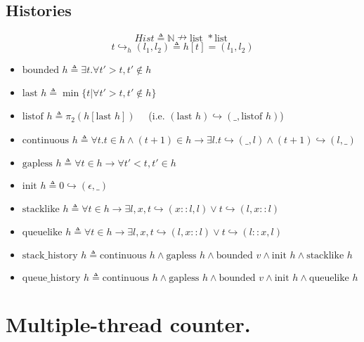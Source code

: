 \documentclass[8pt]{article}
\newcommand{\listpt}{\text{list }}
\begin{document}
\subsection{Histories}
$$Hist \triangleq \mathbb{N} \nrightarrow \listpt * \listpt$$
$$t \hookrightarrow_h (l_1, l_2) \triangleq h[t] = (l_1, l_2)$$
\begin{itemize}
\item $\text{bounded } h  \triangleq \exists t. \forall t' > t, t' \not \in h$
\item $\text{last } h \triangleq \min \{ t | \forall t' > t, t' \not \in h \}$
\item $\text{listof } h \triangleq \pi_2 (h[\text{last } h])$  \ \ (i.e. $(\text{last } h) \hookrightarrow (\_, \text{listof }h )$)
\item $\text{continuous } h  \triangleq \forall t. t\in h \wedge (t+1) \in h \rightarrow \exists l. t \hookrightarrow ( \_ , l) \wedge (t+1) \hookrightarrow (l, \_) $
\item $\text{gapless } h  \triangleq \forall t \in h \rightarrow \forall t' < t, t' \in h $
\item $\text{init } h  \triangleq 0 \hookrightarrow (\epsilon, \_) $
\item $\text{stacklike } h  \triangleq \forall t\in h \rightarrow \exists l, x, t \hookrightarrow ( x::l , l) \vee t \hookrightarrow (l, x::l) $
\item $\text{queuelike } h  \triangleq \forall t\in h \rightarrow \exists l, x, t \hookrightarrow ( l , x::l) \vee t \hookrightarrow (l::x, l) $
\item  $\text{stack\_history } h \triangleq \text{continuous } h \wedge \text{gapless } h \wedge \text{bounded } v \wedge \text{init } h\wedge  \text{stacklike } h $
\item  $\text{queue\_history } h \triangleq \text{continuous } h \wedge \text{gapless } h \wedge \text{bounded } v \wedge \text{init } h\wedge  \text{queuelike } h $
\end{itemize}


\newpage

\section{Multiple-thread counter.}
\lstset{language=C}          %
\end{document}
